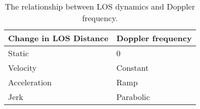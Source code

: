 
\begin{table}[!htb]
\centering
\begin{tabular}{|l|l|}
\hline
\rowcolor[HTML]{C0C0C0} 
Change in \ac{LOS} Distance & Doppler frequency \\ \hline
Static                 & 0                 \\ \hline
\rowcolor[HTML]{EFEFEF} 
Velocity               & Constant          \\ \hline
Acceleration           & Ramp              \\ \hline
\rowcolor[HTML]{EFEFEF} 
Jerk                   & Parabolic         \\ \hline
\end{tabular}
\caption{The relationship between \ac{LOS} dynamics and Doppler frequency.}
\label{tab:DopplerDynamics}
\end{table}